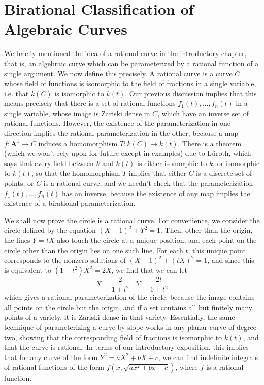 \section{Birational Classification of Algebraic Curves}

We briefly mentioned the idea of a rational curve in the introductory chapter, that is, an algebraic curve which can be parameterized by a rational function of a single argument. We now define this precisely. A rational curve is a curve $C$ whose field of functions is isomorphic to the field of fractions in a single variable, i.e. that $k(C)$ is isomorphic to $k(t)$. Our previous discussion implies that this means precisely that there is a set of rational functions $f_1(t), \dots, f_n(t)$ in a single variable, whose image is Zariski dense in $C$, which have an inverse set of rational functions. However, the existence of the parameterization in one direction implies the rational parameterization in the other, because a map $f: \mathbf{A}^1 \to C$ induces a homomorphism $T: k(C) \to k(t)$. There is a theorem (which we won't rely upon for future except in examples) due to L\"{u}roth, which says that every field between $k$ and $k(t)$ is either isomorphic to $k$, or isomorphic to $k(t)$, so that the homomorphism $T$ implies that either $C$ is a discrete set of points, or $C$ is a rational curve, and we needn't check that the parameterization $f_1(t), \dots, f_n(t)$ has an inverse, because the existence of any map implies the existence of a birational parameterization.

\begin{example}
    We shall now prove the circle is a rational curve. For convenience, we consider the circle defined by the equation $(X-1)^2 + Y^2 = 1$. Then, other than the origin, the lines $Y = tX$ also touch the circle at a unique position, and each point on the circle other than the origin lies on one such line. For each $t$, this unique point corresponds to the nonzero solutions of $(X-1)^2 + (tX)^2 = 1$, and since this is equivalent to $(1+t^2)X^2 = 2X$, we find that we can let
    \[ X = \frac{2}{1 + t^2}\ \ \ \ Y = \frac{2t}{1+t^2} \]
    which gives a rational parameterization of the circle, because the image contains all points on the circle but the origin, and if a set contains all but finitely many points of a variety, it is Zariski dense in that variety. Essentially, the same technique of parameterizing a curve by slope works in any planar curve of degree two, showing that the corresponding field of fractions is isomorphic to $k(t)$, and that the curve is rational. In terms of our introductory exposition, this implies that for any curve of the form $Y^2 = aX^2 + bX + c$, we can find indefinite integrals of rational functions of the form $f(x,\sqrt{ax^2 + bx + c})$, where $f$ is a rational function.
\end{example}

